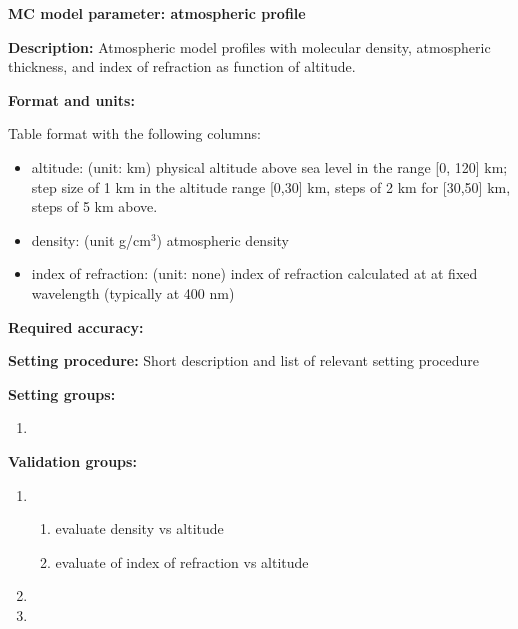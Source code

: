 \textbf{MC model parameter: atmospheric profile}

\textbf{Description: }
Atmospheric model profiles with molecular density, atmospheric thickness, and index of refraction as function of altitude.

\textbf{Format and units:}

Table format with the following columns:

\begin{itemize}
\item altitude: (unit: km) physical altitude above sea level in the range [0, 120] km; step size of 1 km in the altitude range [0,30] km, steps of 2 km for [30,50] km, steps of 5 km above.

\item density: (unit g/cm$^3$) atmospheric density

\item index of refraction: (unit: none) index of refraction calculated at at fixed wavelength (typically at 400 nm)

\end{itemize}



\textbf{Required accuracy:}

\textbf{Setting procedure:}
Short description and list of relevant setting procedure

\textbf{Setting groups:}

\begin{enumerate}
    \item {}
\end{enumerate}

\textbf{Validation groups:}

\begin{enumerate}
    \item {}
    \begin{enumerate}
         \item evaluate density vs altitude
         \item evaluate of index of refraction vs altitude
    \end{enumerate}
    \item {}
    \item {}
\end{enumerate}

